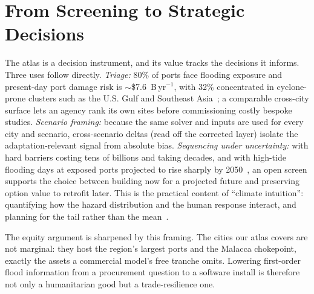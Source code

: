 \documentclass[conference]{IEEEtran}
\begin{document}
\section{From Screening to Strategic Decisions}
The atlas is a decision instrument, and its value tracks the decisions it informs. Three uses follow directly. \emph{Triage:} 80\% of ports face flooding exposure and present-day port damage risk is $\sim$\$7.6~B\,yr$^{-1}$, with 32\% concentrated in cyclone-prone clusters such as the U.S. Gulf and Southeast Asia~\cite{verschuur2023}; a comparable cross-city surface lets an agency rank its own sites before commissioning costly bespoke studies. \emph{Scenario framing:} because the same solver and inputs are used for every city and scenario, cross-scenario deltas (read off the corrected layer) isolate the adaptation-relevant signal from absolute bias. \emph{Sequencing under uncertainty:} with hard barriers costing tens of billions and taking decades, and with high-tide flooding days at exposed ports projected to rise sharply by 2050~\cite{jpm_seachange}, an open screen supports the choice between building now for a projected future and preserving option value to retrofit later. This is the practical content of ``climate intuition'': quantifying how the hazard distribution and the human response interact, and planning for the tail rather than the mean~\cite{jpm_intuition}.

The equity argument is sharpened by this framing. The cities our atlas covers are not marginal: they host the region's largest ports and the Malacca chokepoint, exactly the assets a commercial model's free tranche omits. Lowering first-order flood information from a procurement question to a software install is therefore not only a humanitarian good but a trade-resilience one.
\end{document}
